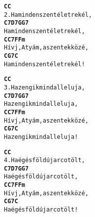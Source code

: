 \begin{minipage}{\textwidth}
\kottastart
{}
\kottaend
\begin{minipage}{\textwidth}
\begin{multicols}{2}
\begin{minipage}{\textwidth}
\begin{alltt}
\textbf{               C           C}
2. Ha minden szent életre kél,
\textbf{               C7    D7    G  G7}
   Ha minden szent életre kél,
\textbf{            C       C7     F   Fm}
   Hívj, Atyám, a szentek közé,
\textbf{               C     G7    C}
   Ha minden szent életre kél!
\end{alltt}
\vspace{0.0cm}
\versszakspacing
\end{minipage}
\begin{minipage}{\textwidth}
\begin{alltt}
\textbf{              C          C}
3. Ha zengik mind alleluja,
\textbf{              C7     D7  G  G7}
   Ha zengik mind alleluja,
\textbf{            C       C7     F   Fm}
   Hívj, Atyám, a szentek közé,
\textbf{              C      G7  C}
   Ha zengik mind alleluja!
\end{alltt}
\vspace{0.0cm}
\versszakspacing
\end{minipage}
\begin{minipage}{\textwidth}
\begin{alltt}
\textbf{             C            C}
4. Ha ég és föld új arcot ölt,
\textbf{             C7     D7    G  G7}
   Ha ég és föld új arcot ölt,
\textbf{            C       C7     F   Fm}
   Hívj, Atyám, a szentek közé,
\textbf{             C      G7    C}
   Ha ég és föld új arcot ölt!
\end{alltt}
\vspace{0.0cm}
\versszakspacing
\end{minipage}
\vspace{0.2cm}
\end{multicols}
\end{minipage}

\end{minipage}
~\vspace{1.0cm}
\newline
